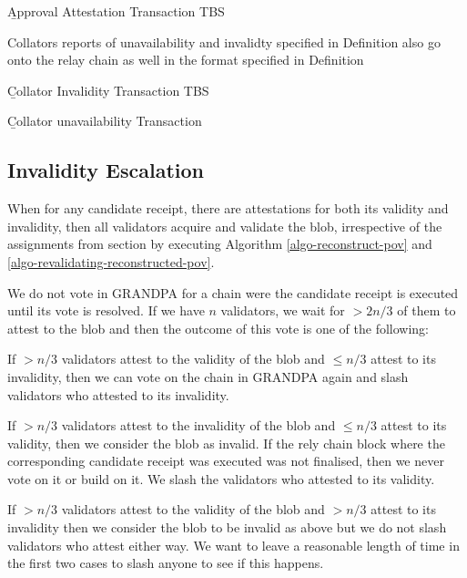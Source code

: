 \begin{definition}
  \label{defn-approval-attestation-transaction}
        {\b Approval Attestation Transaction} TBS
\end{definition}

Collators reports of unavailability and invalidty specified in Definition  also  go onto the relay chain as well in the format specified in Definition

\begin{definition}
  \label{defn-collator-invalidity-transaction}
        {\b Collator Invalidity Transaction}
        TBS
\end{definition}

\begin{definition}
  \label{defn-collator-unavailability-transaction}
        {\b Collator unavailability Transaction}
\end{definition}

\subsection{Invalidity Escalation}\label{escalation}

When for any candidate receipt, there are attestations for both its validity and invalidity, then all validators acquire and validate the blob, irrespective of the assignments from section by executing Algorithm \ref{algo-reconstruct-pov} and \ref{algo-revalidating-reconstructed-pov}.
\newline

We do not vote in GRANDPA for a chain were the candidate receipt is executed until its vote is resolved. If we have $n$ validators, we wait for $>2n/3$ of them to attest to the blob and then the outcome of this vote is one of the following:
\newline

If $>n/3$ validators attest to the validity of the blob and $\leq n/3$ attest to its invalidity, then we can vote on the chain in GRANDPA again and slash validators who attested to its invalidity.
\newline

If $>n/3$ validators attest to the invalidity of the blob and $\leq n/3$ attest to its validity, then we consider the blob as invalid. If the rely chain block where the corresponding candidate receipt was executed was not finalised, then we never vote on it or build on it. We slash the validators who attested to its validity.
\newline

If $>n/3$ validators attest to the validity of the blob and $>n/3$ attest to its invalidity then we consider the blob to be invalid as above but we do not slash validators who attest either way. We want to leave a reasonable length of time in the first two cases to slash anyone to see if this happens.
